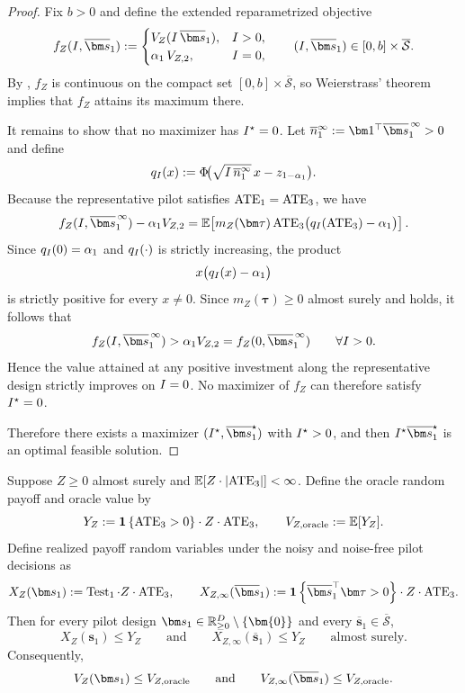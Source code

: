 \begin{proof}
  Fix $b>0$ and define the extended reparametrized objective
  \[
    f_Z(\invst,\overline{\bm s}_1)\defeq
    \begin{cases}
      V_Z(\invst\,\overline{\bm s}_1), & \invst>0,\\
      \alpha_1\,V_{Z,\followup}, & \invst=0,
    \end{cases}
    \qquad
    (\invst,\overline{\bm s}_1)\in[0,b]\times\overline{\mathcal{S}}.
  \]
  By , $f_Z$ is continuous on the compact set $[0,b]\times\overline{\mathcal{S}}$, so Weierstrass' theorem implies that $f_Z$ attains its maximum there.

  It remains to show that no maximizer has $I^\star=0$.
  Let $\overline n_1^\infty\defeq \bm1^\top\overline{\bm s}_1^{\,\infty}>0$ and define
  \[
    q_I(x)
    :=
    \Phi\!\big(\sqrt{I\,\overline n_1^\infty}\,x-z_{1-\alpha_1}\big).
  \]
  Because the representative pilot satisfies $\mathrm{ATE}_1=\mathrm{ATE}_3$, we have
  \[
    f_Z(\invst,\overline{\bm s}_1^{\,\infty})-
    \alpha_1V_{Z,\followup}
    =
    \E\!\left[
      m_Z(\bm\tau)\,\ATE_3\big(q_\invst(\ATE_3)-\alpha_1\big)
    \right].
  \]
  Since $q_I(0)=\alpha_1$ and $q_I(\cdot)$ is strictly increasing, the product
  \[
    x\big(q_I(x)-\alpha_1\big)
  \]
  is strictly positive for every $x\neq0$.
  Since $m_Z(\bm\tau)\ge0$ almost surely and  holds, it follows that
  \[
    f_Z(\invst,\overline{\bm s}_1^{\,\infty})>
    \alpha_1V_{Z,\followup}
    =
    f_Z(0,\overline{\bm s}_1^{\,\infty})
    \qquad
    \forall \invst>0.
  \]
  Hence the value attained at any positive investment along the representative design strictly improves on $I=0$.
  No maximizer of $f_Z$ can therefore satisfy $I^\star=0$.

  Therefore there exists a maximizer $(\invst^\star,\overline{\bm s}_1^\star)$ with $I^\star>0$, and then $\invst^\star\overline{\bm s}_1^\star$ is an optimal feasible solution.
\end{proof}

\begin{lemma}
  \label{lem:oracle-upper-bound-weighted}
  Suppose $Z\ge0$ almost surely and $\mathbb{E}[Z\cdot |\mathrm{ATE}_3|]<\infty$.
  Define the oracle random payoff and oracle value by
  \[
    Y_Z
    :=
    \mathbf{1}\left\{\mathrm{ATE}_3>0\right\}\cdot Z\cdot \mathrm{ATE}_3,
    \qquad
    V_{Z,\mathrm{oracle}}
    :=
    \mathbb{E}[Y_Z].
  \]
  Define realized payoff random variables under the noisy and noise-free pilot decisions as
  \[
    X_Z(\bm s_1)\defeq \Test_1\cdot Z\cdot \ATE_3,
    \qquad
    X_{Z,\infty}(\overline{\bm s}_1)
    \defeq
    \indic{\overline{\bm s}_1^\top\bm\tau>0}\cdot Z\cdot \ATE_3.
  \]
  Then for every pilot design $\bm s_1\in\R_{\geq 0}^{D} \setminus \{\bm{0}\}$ and every $\overline{\bm s}_1\in\overline{\mathcal{S}}$,
  \[
    X_Z(\bm s_1)\le Y_Z
    \qquad\text{and}\qquad
    X_{Z,\infty}(\overline{\bm s}_1)\le Y_Z
    \qquad\text{almost surely.}
  \]
  Consequently,
  \[
    V_Z(\bm s_1)\le V_{Z,\oracle}
    \qquad\text{and}\qquad
    V_{Z,\noisefree}(\overline{\bm s}_1)\le V_{Z,\oracle}.
  \]
\end{lemma}

